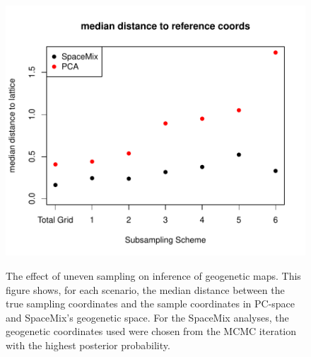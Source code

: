 \documentclass[10pt,letterpaper]{article}
\begin{document}
\begin{figure}
\centering
	{\includegraphics[width=\textwidth]{../figs/sims/median_dist_comp.pdf}}
	\caption{The effect of uneven sampling on inference of geogenetic maps.  
			This figure shows, for each scenario, the median distance 
			between the true sampling coordinates and the sample coordinates 
			in PC-space and SpaceMix's geogenetic space.  For the SpaceMix 
			analyses, the geogenetic coordinates used were chosen from the 
			MCMC iteration with the highest posterior probability.}
			\label{sfig:uneven_sampling_med_dist}
\end{figure}
\end{document}
